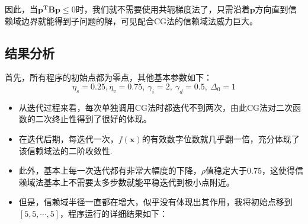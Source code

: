 因此，当$\bm{p^TBp}\leq 0$时，我们就不需要使用共轭梯度法了，只需沿着$\bm{p}$方向直到信赖域边界就能得到子问题的解，可见配合CG法的信赖域法威力巨大。

\subsection*{结果分析}
首先，所有程序的初始点都为零点，其他基本参数如下：\[\eta_{s}=0.25,\eta_{v}=0.75,\ \gamma_{i}=2,\ 
\gamma_{d}=0.5,\ \Delta_0=1\]

\begin{itemize}
\item
从迭代过程来看，每次单独调用CG法时都迭代不到两次，由此CG法对二次函数的二次终止性得到了很好的体现。

\item
在迭代后期，每迭代一次，$f(\bm{x})$的有效数字位数就几乎翻一倍，充分体现了该信赖域法的二阶收敛性.

\item
此外，基本上每一次迭代都有非常大幅度的下降，$\rho$值稳定大于0.75，这使得信赖域法基本上不需要太多步数就能平稳迭代到极小点附近。

\item
但是，信赖域半径一直都在增大，似乎没有体现出其作用，我将初始点移到$[5,5,\cdots,5]$，程序运行的详细结果如下：
\end{itemize}
